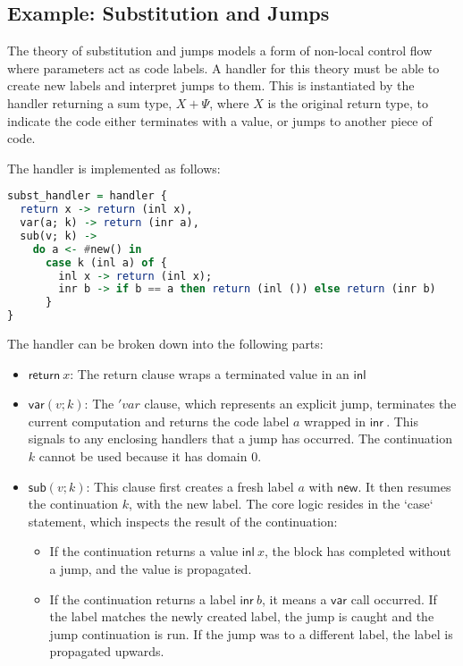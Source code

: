 \documentclass{article}
\theoremstyle{definition}
\theoremstyle{remark}
\newcommand\new{\mathsf{new}}
\newcommand\ret[1]{{\mathsf{return} \ #1}}
\newcommand\sub{\mathsf{sub}}
\newcommand\var{\mathsf{var}}
\newcommand\inl[1]{{\mathsf{inl} \ #1}}
\newcommand\inr[1]{{\mathsf{inr} \ #1}}
\begin{document}
\subsection{Example: Substitution and Jumps}

The theory of substitution and jumps models a form of non-local control flow where parameters act as code labels.
A handler for this theory must be able to create new labels and interpret jumps to them.
This is instantiated by the handler returning a sum type, $X + \Psi$, where $X$ is the original return type, to indicate the code either terminates with a value, or jumps to another piece of code.

The handler is implemented as follows:

\begin{lstlisting}[language=Haskell, basicstyle=\small\ttfamily]
subst_handler = handler {
  return x -> return (inl x),
  var(a; k) -> return (inr a),
  sub(v; k) ->
    do a <- #new() in
      case k (inl a) of {
        inl x -> return (inl x);
        inr b -> if b == a then return (inl ()) else return (inr b)
      }
}
\end{lstlisting}

The handler can be broken down into the following parts:
\begin{itemize}
    \item $\ret{x}$: The return clause wraps a terminated value in an $\inl{}$
    \item $\var(v; k)$: The $'var$ clause, which represents an explicit jump, terminates the current computation and returns the code label $a$ wrapped in $\inr{}$.
      This signals to any enclosing handlers that a jump has occurred. The continuation $k$ cannot be used because it has domain $0$.
    \item $\sub(v; k)$: This clause first creates a fresh label $a$ with $\new$. It then resumes the continuation $k$, with the new label.
      The core logic resides in the `case` statement, which inspects the result of the continuation:
      \begin{itemize}
          \item If the continuation returns a value $\inl x$, the block has completed without a jump, and the value is propagated.
          \item If the continuation returns a label $\inr b$, it means a $\var$ call occurred. If the label matches the newly created label, the jump is caught and the jump continuation is run.
            If the jump was to a different label, the label is propagated upwards.
      \end{itemize}
\end{itemize}
\end{document}
